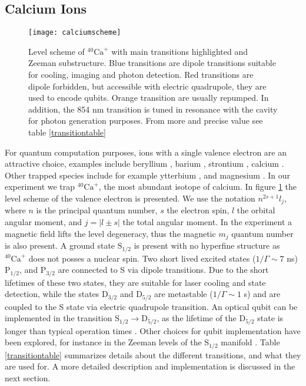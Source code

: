 \subsection{Calcium Ions}
\label{sec:calciumion}
\begin{figure}
\centering
\texttt{[image: calciumscheme]}
\caption{Level scheme of $^{40}\text{Ca}^+$ with main transitions highlighted and Zeeman substructure. Blue transitions are dipole transitions suitable for cooling, imaging and photon detection. Red transitions are dipole forbidden, but accessible with electric quadrupole, they are used to encode qubits. Orange transition are usually repumped. In addition, the 854 nm transition is tuned in resonance with the cavity for photon generation purposes. From more and precise value see table \ref{transitiontable}}
\label{calciumscheme}
\end{figure}
For quantum computation purposes, ions with a single valence electron are an attractive choice, examples include beryllium \cite{beryllium}, barium \cite{barium}, strontium \cite{strontium}, calcium \cite{calcium}. Other trapped species include for example ytterbium \cite{PhysRevA.44.R20}, and magnesium \cite{magnesium}. In our experiment we trap $^{40}\text{Ca}^+$, the most abundant isotope of calcium. In figure \ref{calciumscheme} the level scheme of the valence electron is presented. We use the notation $n^{2s+1}l_j$, where $n$ is the principal quantum number, $s$ the electron spin, $l$ the orbital angular moment, and $j = |l\pm s|$ the total angular moment. In the experiment a magnetic field lifts the level degeneracy, thus the magnetic $m_j$ quantum number is also present. A ground state $\text{S}_{1/2}$ is present with no hyperfine structure as $^{40}\text{Ca}^+$ does not posses a nuclear spin. Two short lived excited states ($1/\Gamma \sim 7$ ns) $\text{P}_{1/2}$, and $\text{P}_{3/2}$ are connected to S via dipole transitions. Due to the short lifetimes of these two states, they are suitable for laser cooling and state detection, while the states $\text{D}_{3/2}$ and $\text{D}_{5/2}$
are metastable ($ 1/\Gamma \sim 1$ s) and are coupled to the S state via electric quadrupole transition. An optical qubit can be implemented in the transition $\text{S}_{1/2} \to \text{D}_{5/2}$, as the lifetime of the $\text{D}_{5/2}$ state is longer than typical operation times \cite{calciumqubit}. Other choices for qubit implementation have been explored, for instance in the Zeeman levels of the $\text{S}_{1/2}$ manifold \cite{Ruster2016}. Table \ref{transitiontable} summarizes details about the different transitions, and what they are used for. A more detailed description and implementation is discussed in the next section.

